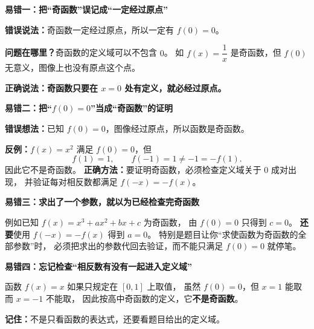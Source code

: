 \clearpage
\begin{trapbox}
  \textbf{\textcolor{CTrap}{易错一：把“奇函数”误记成“一定经过原点”}}



  \textbf{错误说法：}奇函数一定经过原点，所以一定有 $f(0)=0$。

  \textbf{问题在哪里？}奇函数的定义域可以不包含 $0$。
  如 $f(x)=\dfrac1x$ 是奇函数，但 $f(0)$ 无意义，图像上也没有原点这个点。

  \textbf{正确说法：}\textbf{奇函数只要在 $x=0$ 处有定义，就必经过原点。}

  \medskip
  
\end{trapbox}
\clearpage
\begin{trapbox}
\textbf{\textcolor{CTrap}{易错二：把“$f(0)=0$”当成“奇函数”的证明}}



  \textbf{错误想法：}已知 $f(0)=0$，图像经过原点，所以函数是奇函数。

  \textbf{反例：}$f(x)=x^2$ 满足 $f(0)=0$，但
  \[
    f(1)=1,\qquad f(-1)=1\ne-1=-f(1).
  \]
  因此它不是奇函数。
  \textbf{正确方法：}要证明奇函数，必须检查定义域关于 $0$ 成对出现，
  并验证每对相反数都满足 $f(-x)=-f(x)$。

  \medskip
  
\end{trapbox}
\clearpage
\begin{trapbox}
\textbf{\textcolor{CTrap}{易错三：求出了一个参数，就以为已经检查完奇函数}}



  例如已知 $f(x)=x^3+ax^2+bx+c$ 为奇函数，
  由 $f(0)=0$ 只得到 $c=0$。
  \textbf{还要}使用 $f(-x)=-f(x)$ 得到 $a=0$。
  特别是题目让你“求使函数为奇函数的全部参数”时，
  必须把求出的参数代回去验证，而不能只满足 $f(0)=0$ 就停笔。

  \medskip
  
\end{trapbox}
\clearpage
\begin{trapbox}
\textbf{\textcolor{CTrap}{易错四：忘记检查“相反数有没有一起进入定义域”}}



  函数 $f(x)=x$ 如果只规定在 $[0,1]$ 上取值，
  虽然 $f(0)=0$，但 $x=1$ 能取而 $x=-1$ 不能取，
  因此按高中奇函数的定义，它\textbf{不是奇函数}。

  \textbf{记住：}不是只看函数的表达式，还要看题目给出的定义域。

  \medskip
  
\end{trapbox}
